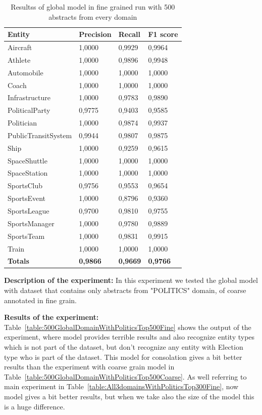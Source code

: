 \documentclass[thesis=M,english]{FITthesis}[2018/05/30]
\begin{document}
	\begin{table}[H]\centering
		\begin{tabular}{|l|l|l|l|}
			\hline {\textbf{Entity}} & {\textbf{Precision}} & {\textbf{Recall}} & {\textbf{F1 score}}\\\hline
				Aircraft & 1,0000 & 0,9929 & 0,9964\\
				Athlete & 1,0000 & 0,9896 & 0,9948\\
				Automobile & 1,0000 & 1,0000 & 1,0000\\ 
				Coach & 1,0000 & 1,0000 & 1,0000\\
				Infrastructure & 1,0000 & 0,9783 & 0,9890\\
				PoliticalParty & 0,9775 & 0,9403 & 0,9585\\
				Politician & 1,0000 & 0,9874 & 0,9937\\
				PublicTransitSystem & 0,9944 & 0,9807 & 0,9875\\
				Ship & 1,0000 & 0,9259 & 0,9615\\
				SpaceShuttle & 1,0000 & 1,0000 & 1,0000\\
				SpaceStation & 1,0000 & 1,0000 & 1,0000\\ 
				SportsClub & 0,9756 & 0,9553 & 0,9654\\
				SportsEvent & 1,0000 & 0,8796 & 0,9360\\
				SportsLeague & 0,9700 & 0,9810 & 0,9755\\
				SportsManager & 1,0000 & 0,9780 & 0,9889\\
				SportsTeam & 1,0000 & 0,9831 & 0,9915\\
				Train & 1,0000 & 1,0000 & 1,0000\\\hline
				\textbf{Totals} & \textbf{0,9866} & \textbf{0,9669} & \textbf{0,9766}\\\hline
		\end{tabular}
		\caption{Resultss of global model in fine grained run with 500 abstracts from every domain \label{table:500GlobalDomainWithAllAbstractsTop500Fine}}
	\end{table}

\textbf{Description of the experiment:} In this experiment we tested the global model with dataset that contains only abstracts from "POLITICS" domain, of coarse annotated in fine grain.  

	\textbf{Results of the experiment:} Table~\ref{table:500GlobalDomainWithPoliticsTop500Fine} shows the output of the experiment, where model provides terrible results and also recognize entity types which is not part of the dataset, but don't recognize any entity with Election type who is part of the dataset. This model for consolation gives a bit better results than the experiment with coarse grain model in Table~\ref{table:500GlobalDomainWithPoliticsTop500Coarse}. As well referring to main experiment in Table~\ref{table:All3domainsWithPoliticsTop300Fine}, now model gives a bit better results, but when we take also the size of the model this is a huge difference.
\end{document}
